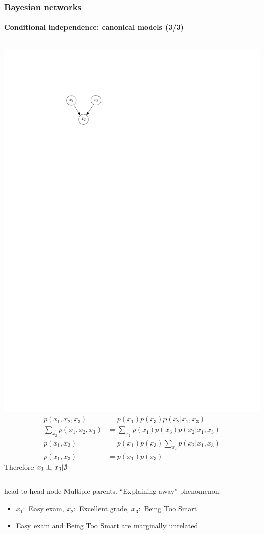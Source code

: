 \documentclass[slidestop,compress,mathserif]{beamer}
\newcommand{\bi}{\begin{itemize}}
\newcommand{\ei}{\end{itemize}}
\newcommand{\indep}{\ensuremath{\perp\mkern -10mu \perp}}
\begin{document}
\begin{frame}
	\frametitle{Bayesian networks}
	\framesubtitle{Conditional independence: canonical models (3/3)}
  \begin{columns}
    \includegraphics[width=.8\textwidth]{tailtotail}%
   \begin{align*}
   p(x_1,x_2,x_3) & = p(x_1)p(x_3)p(x_2|x_1,x_3)\\
   \sum_{x_2}p(x_1,x_2,x_3) & = \sum_{x_2}p(x_1)p(x_3)p(x_2|x_1,x_3)\\
   p(x_1,x_3) & = p(x_1)p(x_3)\sum_{x_2}p(x_2|x_1,x_3)\\
   p(x_1,x_3) & = p(x_1)p(x_3)
   \end{align*}
   Therefore $x_1 \indep x_3 | \emptyset$
   \end{columns} 
    \begin{block}{head-to-head node}
    Multiple parents. ``Explaining away'' phenomenon:
    \bi
    \item
     $x_1: $ Easy exam, $x_2 :$ Excellent grade, $x_3 :$ Being Too Smart
    \item Easy exam and Being Too Smart are marginally unrelated
    \ei
    \end{block}
\end{frame}
\end{document}
